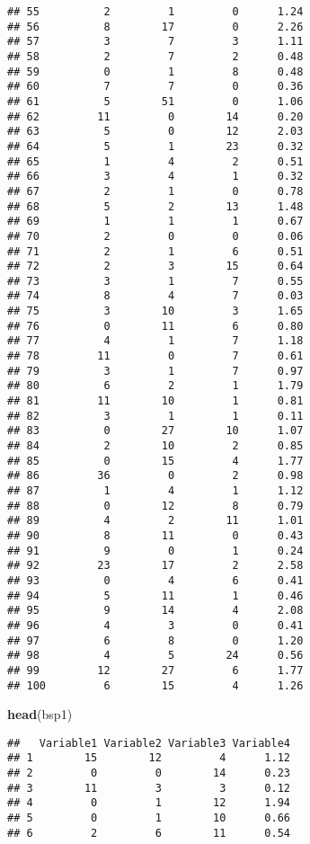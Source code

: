 \documentclass[]{article}
\newenvironment{Shaded}{\begin{snugshade}}{\end{snugshade}}
\newcommand{\KeywordTok}[1]{\textcolor[rgb]{0.13,0.29,0.53}{\textbf{#1}}}
\newcommand{\NormalTok}[1]{#1}
\begin{document}
\begin{verbatim}
## 55          2         1         0      1.24
## 56          8        17         0      2.26
## 57          3         7         3      1.11
## 58          2         7         2      0.48
## 59          0         1         8      0.48
## 60          7         7         0      0.36
## 61          5        51         0      1.06
## 62         11         0        14      0.20
## 63          5         0        12      2.03
## 64          5         1        23      0.32
## 65          1         4         2      0.51
## 66          3         4         1      0.32
## 67          2         1         0      0.78
## 68          5         2        13      1.48
## 69          1         1         1      0.67
## 70          2         0         0      0.06
## 71          2         1         6      0.51
## 72          2         3        15      0.64
## 73          3         1         7      0.55
## 74          8         4         7      0.03
## 75          3        10         3      1.65
## 76          0        11         6      0.80
## 77          4         1         7      1.18
## 78         11         0         7      0.61
## 79          3         1         7      0.97
## 80          6         2         1      1.79
## 81         11        10         1      0.81
## 82          3         1         1      0.11
## 83          0        27        10      1.07
## 84          2        10         2      0.85
## 85          0        15         4      1.77
## 86         36         0         2      0.98
## 87          1         4         1      1.12
## 88          0        12         8      0.79
## 89          4         2        11      1.01
## 90          8        11         0      0.43
## 91          9         0         1      0.24
## 92         23        17         2      2.58
## 93          0         4         6      0.41
## 94          5        11         1      0.46
## 95          9        14         4      2.08
## 96          4         3         0      0.41
## 97          6         8         0      1.20
## 98          4         5        24      0.56
## 99         12        27         6      1.77
## 100         6        15         4      1.26
\end{verbatim}

\begin{Shaded}
\begin{Highlighting}[]
\KeywordTok{head}\NormalTok{(bsp1)}
\end{Highlighting}
\end{Shaded}

\begin{verbatim}
##   Variable1 Variable2 Variable3 Variable4
## 1        15        12         4      1.12
## 2         0         0        14      0.23
## 3        11         3         3      0.12
## 4         0         1        12      1.94
## 5         0         1        10      0.66
## 6         2         6        11      0.54
\end{verbatim}
\end{document}
